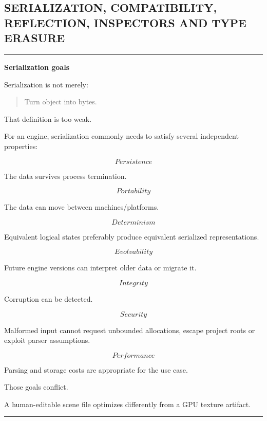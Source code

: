 \subsection{SERIALIZATION, COMPATIBILITY, REFLECTION, INSPECTORS AND TYPE ERASURE}\label{05-engine-i-ch011-serialization-compatibility-reflection-inspectors-and-type-erasure}

\begin{center}\rule{0.5\linewidth}{0.5pt}\end{center}

\textbf{Serialization goals}

Serialization is not merely:

\begin{quote}
Turn object into bytes.
\end{quote}

That definition is too weak.

For an engine, serialization commonly needs to satisfy several independent properties:

\[
\boxed{
Persistence
}
\]

The data survives process termination.

\[
\boxed{
Portability
}
\]

The data can move between machines/platforms.

\[
\boxed{
Determinism
}
\]

Equivalent logical states preferably produce equivalent serialized representations.

\[
\boxed{
Evolvability
}
\]

Future engine versions can interpret older data or migrate it.

\[
\boxed{
Integrity
}
\]

Corruption can be detected.

\[
\boxed{
Security
}
\]

Malformed input cannot request unbounded allocations, escape project roots or exploit parser assumptions.

\[
\boxed{
Performance
}
\]

Parsing and storage costs are appropriate for the use case.

Those goals conflict.

A human-editable scene file optimizes differently from a GPU texture artifact.

\begin{center}\rule{0.5\linewidth}{0.5pt}\end{center}

